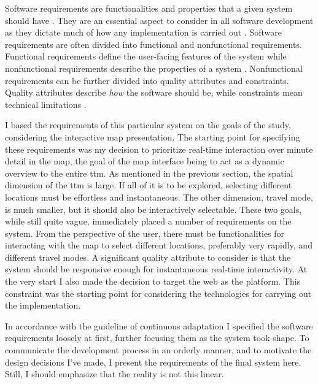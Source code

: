 Software requirements are functionalities and properties
that a given system should have \parencite{chu2009}.
They are an essential aspect to consider in all software development
as they dictate much of how any implementation is carried out \parencite{saq2020}.
Software requirements are often divided into
functional and nonfunctional requirements.
Functional requirements define the user-facing features of the system
while nonfunctional requirements describe the properties of a system
\parencite{chu2009}.
Nonfunctional requirements can be further divided into
quality attributes and constraints.
Quality attributes describe \textit{how} the software should be,
while constraints mean technical limitations \parencite{chu2009}.

I based the requirements of this particular system on the goals of the study,
considering the interactive map presentation.
The starting point for specifying these requirements
was my decision to prioritize real-time interaction over minute detail in the map,
the goal of the map interface being to act as a dynamic overview to the entire \acrshort{ttm}.
As mentioned in the previous section,
the spatial dimension of the \acrshort{ttm} is large.
If all of it is to be explored,
selecting different locations must be effortless and instantaneous.
The other dimension, travel mode, is much smaller,
but it should also be interactively selectable.
These two goals, while still quite vague,
immediately placed a number of requirements on the system.
From the perspective of the user,
there must be functionalities for interacting with the map to
select different locations, preferably very rapidly,
and different travel modes.
A significant quality attribute to consider is that the system should
be responsive enough for instantaneous real-time interactivity.
At the very start I also made the decision to target the web as the platform.
This constraint was the starting point for considering the technologies
for carrying out the implementation.

In accordance with the guideline of continuous adaptation
\parencite{bec2001} I specified the software requirements loosely at first,
further focusing them as the system took shape.
To communicate the development process in an orderly manner,
and to motivate the design decisions I've made, I present
the requirements of the final system here.
Still, I should emphasize that the reality is not this linear.


